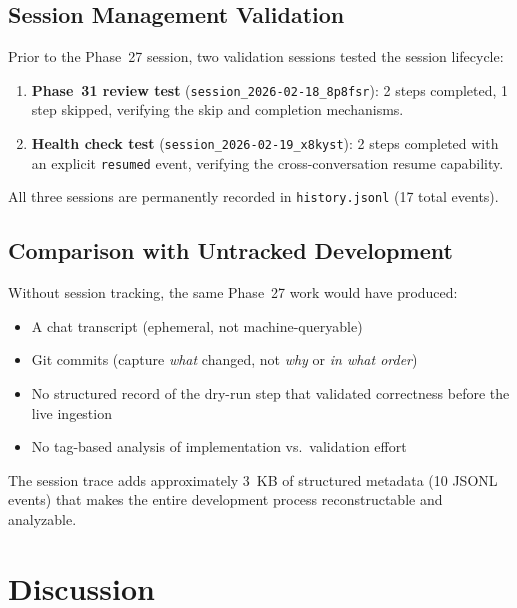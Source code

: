 \documentclass[11pt,letterpaper]{article}
\begin{document}
\subsection{Session Management Validation}

Prior to the Phase~27 session, two validation sessions tested the
session lifecycle:

\begin{enumerate}[nosep]
    \item \textbf{Phase~31 review test}
          (\texttt{session\_2026-02-18\_8p8fsr}): 2 steps completed,
          1 step skipped, verifying the skip and completion mechanisms.
    \item \textbf{Health check test}
          (\texttt{session\_2026-02-19\_x8kyst}): 2 steps completed
          with an explicit \texttt{resumed} event, verifying the
          cross-conversation resume capability.
\end{enumerate}

All three sessions are permanently recorded in \texttt{history.jsonl}
(17 total events).

\subsection{Comparison with Untracked Development}

Without session tracking, the same Phase~27 work would have produced:

\begin{itemize}[nosep]
    \item A chat transcript (ephemeral, not machine-queryable)
    \item Git commits (capture \emph{what} changed, not \emph{why} or
          \emph{in what order})
    \item No structured record of the dry-run step that validated
          correctness before the live ingestion
    \item No tag-based analysis of implementation vs.\ validation effort
\end{itemize}

The session trace adds approximately 3~KB of structured metadata
(10 JSONL events) that makes the entire development process
reconstructable and analyzable.

\section{Discussion}
\label{sec:discussion}
\end{document}
